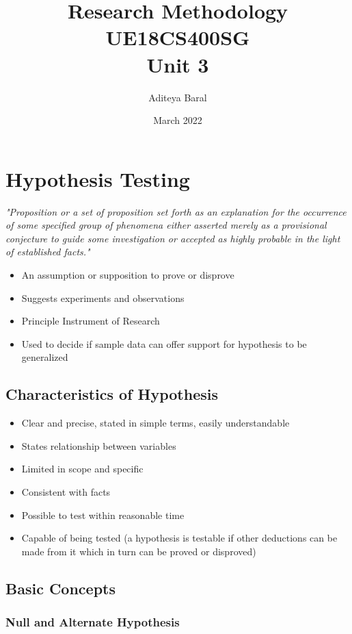 \documentclass{article}
\title{Research Methodology UE18CS400SG \\ Unit 3}
\author{Aditeya Baral}
\date{March 2022}
\begin{document}
\maketitle

\section{Hypothesis Testing}

\textit{"Proposition or a set of proposition set forth as an explanation for the
occurrence of some specified group of phenomena either asserted merely
as a provisional conjecture to guide some investigation or accepted as
highly probable in the light of established facts."}

\begin{itemize}
    \item An assumption or supposition to prove or disprove
    \item Suggests experiments and observations
    \item Principle Instrument of Research
    \item Used to decide if sample data can offer support for hypothesis to be generalized
\end{itemize}

\subsection{Characteristics of Hypothesis}

\begin{itemize}
    \item Clear and precise, stated in simple terms, easily understandable
    \item States relationship between variables
    \item Limited in scope and specific
    \item Consistent with facts
    \item Possible to test within reasonable time
    \item Capable of being tested (a hypothesis is testable if other deductions can be made from it which in turn can be proved or disproved)
\end{itemize}

\subsection{Basic Concepts}

\subsubsection{Null and Alternate Hypothesis}
\end{document}
